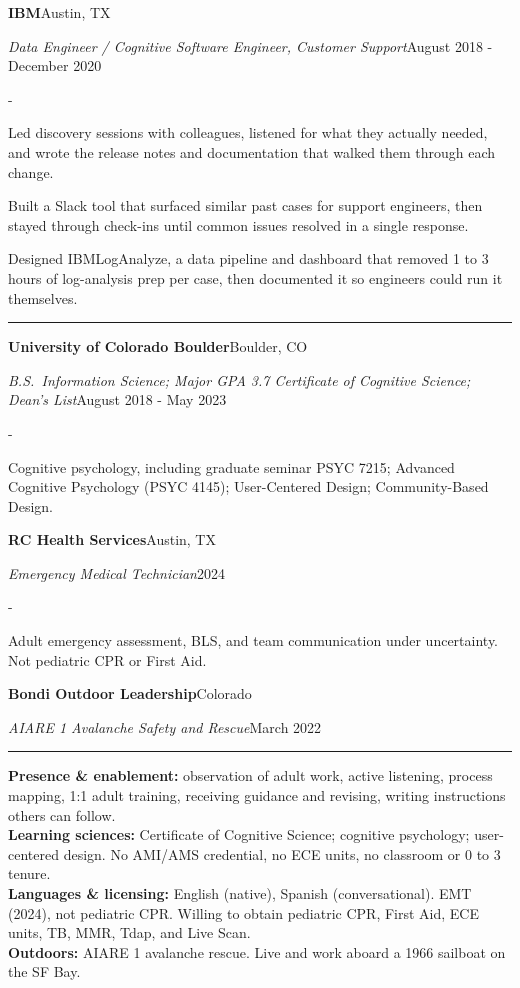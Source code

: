 \documentclass[10pt,letterpaper]{article}
\newenvironment{cvitems}{%
  \begin{list}{-}{%
    \setlength{\leftmargin}{12pt}%
    \setlength{\itemsep}{1.2pt}%
    \setlength{\parsep}{0pt}%
    \setlength{\topsep}{1.5pt}%
    \setlength{\partopsep}{0pt}%
    \setlength{\labelwidth}{6pt}%
    \setlength{\labelsep}{6pt}%
    \setlength{\itemindent}{0pt}%
  }%
}{\end{list}}
\newcommand{\cvsection}[1]{%
  \vspace{7pt}%
  \noindent{\bfseries\fontsize{11pt}{13pt}\selectfont\MakeUppercase{#1}}\par
  \vspace{1pt}%
  \noindent\rule{\textwidth}{0.4pt}\par
  \vspace{4pt}%
}
\newcommand{\cventryhead}[4]{%
  \noindent\textbf{#1}\hfill#2\par
  \vspace{0.5pt}%
  \noindent\textit{#3}\hfill#4\par
}
\newcommand{\cveduhead}[4]{%
  \noindent\textbf{#1}\hfill#2\par
  \vspace{0.5pt}%
  \noindent\textit{#3}\hfill#4\par
}
\begin{document}
\vspace{3pt}
\cventryhead{IBM}{Austin, TX}
{Data Engineer / Cognitive Software Engineer, Customer Support}{August 2018 - December 2020}
\begin{cvitems}
  \item Led discovery sessions with colleagues, listened for what they actually needed, and wrote the release notes and documentation that walked them through each change.
  \item Built a Slack tool that surfaced similar past cases for support engineers, then stayed through check-ins until common issues resolved in a single response.
  \item Designed IBMLogAnalyze, a data pipeline and dashboard that removed 1 to 3 hours of log-analysis prep per case, then documented it so engineers could run it themselves.
\end{cvitems}

\cvsection{Education}

\cveduhead{University of Colorado Boulder}{Boulder, CO}
{B.S.\ Information Science; Major GPA 3.7 \textbar{} Certificate of Cognitive Science; Dean's List}{August 2018 - May 2023}
\begin{cvitems}
  \item Cognitive psychology, including graduate seminar PSYC 7215; Advanced Cognitive Psychology (PSYC 4145); User-Centered Design; Community-Based Design.
\end{cvitems}

\vspace{3pt}
\cveduhead{RC Health Services}{Austin, TX}
{Emergency Medical Technician}{2024}
\begin{cvitems}
  \item Adult emergency assessment, BLS, and team communication under uncertainty. Not pediatric CPR or First Aid.
\end{cvitems}

\vspace{3pt}
\cveduhead{Bondi Outdoor Leadership}{Colorado}
{AIARE 1 Avalanche Safety and Rescue}{March 2022}

\cvsection{Skills}

{\raggedright
\noindent\textbf{Presence \& enablement:} observation of adult work, active listening, process mapping, 1:1 adult training, receiving guidance and revising, writing instructions others can follow.\\[2pt]
\noindent\textbf{Learning sciences:} Certificate of Cognitive Science; cognitive psychology; user-centered design. No AMI/AMS credential, no ECE units, no classroom or 0 to 3 tenure.\\[2pt]
\noindent\textbf{Languages \& licensing:} English (native), Spanish (conversational). EMT (2024), not pediatric CPR. Willing to obtain pediatric CPR, First Aid, ECE units, TB, MMR, Tdap, and Live Scan.\\[2pt]
\noindent\textbf{Outdoors:} AIARE 1 avalanche rescue. Live and work aboard a 1966 sailboat on the SF Bay.\par
}
\end{document}
